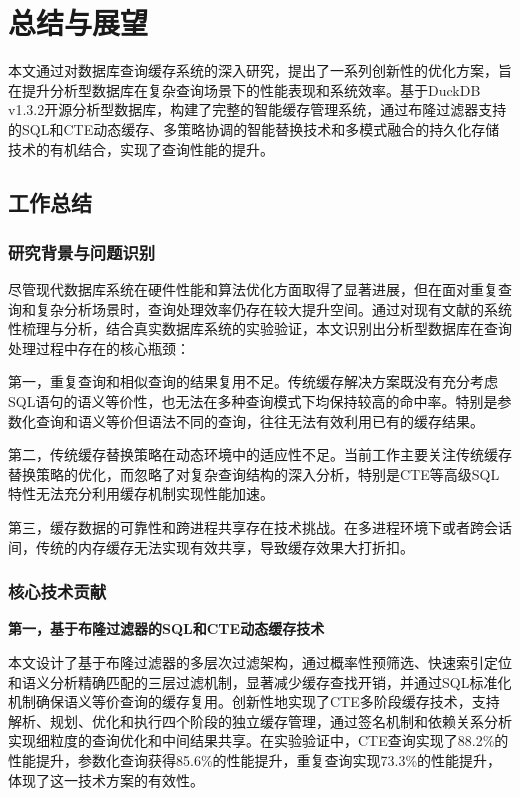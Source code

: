 \chapter{总结与展望}

本文通过对数据库查询缓存系统的深入研究，提出了一系列创新性的优化方案，旨在提升分析型数据库在复杂查询场景下的性能表现和系统效率。基于DuckDB v1.3.2开源分析型数据库，构建了完整的智能缓存管理系统，通过布隆过滤器支持的SQL和CTE动态缓存、多策略协调的智能替换技术和多模式融合的持久化存储技术的有机结合，实现了查询性能的提升。

\section{工作总结}

\subsection{研究背景与问题识别}

尽管现代数据库系统在硬件性能和算法优化方面取得了显著进展，但在面对重复查询和复杂分析场景时，查询处理效率仍存在较大提升空间。通过对现有文献的系统性梳理与分析，结合真实数据库系统的实验验证，本文识别出分析型数据库在查询处理过程中存在的核心瓶颈：

第一，重复查询和相似查询的结果复用不足。传统缓存解决方案既没有充分考虑SQL语句的语义等价性，也无法在多种查询模式下均保持较高的命中率。特别是参数化查询和语义等价但语法不同的查询，往往无法有效利用已有的缓存结果。

第二，传统缓存替换策略在动态环境中的适应性不足。当前工作主要关注传统缓存替换策略的优化，而忽略了对复杂查询结构的深入分析，特别是CTE等高级SQL特性无法充分利用缓存机制实现性能加速。

第三，缓存数据的可靠性和跨进程共享存在技术挑战。在多进程环境下或者跨会话间，传统的内存缓存无法实现有效共享，导致缓存效果大打折扣。

\subsection{核心技术贡献}

\textbf{第一，基于布隆过滤器的SQL和CTE动态缓存技术}

本文设计了基于布隆过滤器的多层次过滤架构，通过概率性预筛选、快速索引定位和语义分析精确匹配的三层过滤机制，显著减少缓存查找开销，并通过SQL标准化机制确保语义等价查询的缓存复用。创新性地实现了CTE多阶段缓存技术，支持解析、规划、优化和执行四个阶段的独立缓存管理，通过签名机制和依赖关系分析实现细粒度的查询优化和中间结果共享。在实验验证中，CTE查询实现了88.2\%的性能提升，参数化查询获得85.6\%的性能提升，重复查询实现73.3\%的性能提升，体现了这一技术方案的有效性。

